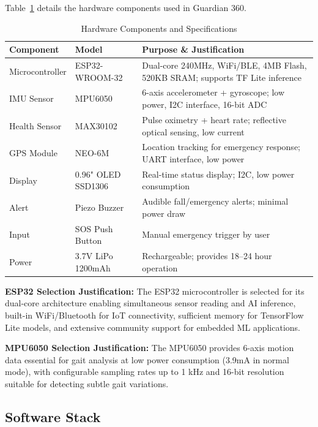 \documentclass[conference]{IEEEtran}
\begin{document}
Table~\ref{tab:hardware} details the hardware components used in Guardian 360.

\begin{table}[!t]
\caption{Hardware Components and Specifications}
\label{tab:hardware}
\centering
\footnotesize
\begin{tabular}{|p{1.8cm}|p{2cm}|p{3.5cm}|}
\hline
\textbf{Component} & \textbf{Model} & \textbf{Purpose \& Justification} \\
\hline
Microcontroller & ESP32-WROOM-32 & Dual-core 240MHz, WiFi/BLE, 4MB Flash, 520KB SRAM; supports TF Lite inference \\
\hline
IMU Sensor & MPU6050 & 6-axis accelerometer + gyroscope; low power, I2C interface, 16-bit ADC \\
\hline
Health Sensor & MAX30102 & Pulse oximetry + heart rate; reflective optical sensing, low current \\
\hline
GPS Module & NEO-6M & Location tracking for emergency response; UART interface, low power \\
\hline
Display & 0.96" OLED SSD1306 & Real-time status display; I2C, low power consumption \\
\hline
Alert & Piezo Buzzer & Audible fall/emergency alerts; minimal power draw \\
\hline
Input & SOS Push Button & Manual emergency trigger by user \\
\hline
Power & 3.7V LiPo 1200mAh & Rechargeable; provides 18--24 hour operation \\
\hline
\end{tabular}
\end{table}

\textbf{ESP32 Selection Justification:} The ESP32 microcontroller is selected for its dual-core architecture enabling simultaneous sensor reading and AI inference, built-in WiFi/Bluetooth for IoT connectivity, sufficient memory for TensorFlow Lite models, and extensive community support for embedded ML applications.

\textbf{MPU6050 Selection Justification:} The MPU6050 provides 6-axis motion data essential for gait analysis at low power consumption (3.9mA in normal mode), with configurable sampling rates up to 1 kHz and 16-bit resolution suitable for detecting subtle gait variations.

\subsection{Software Stack}
\end{document}
